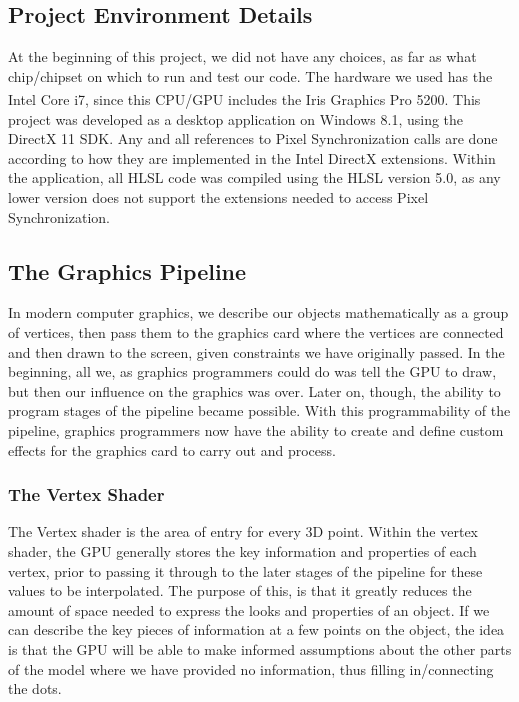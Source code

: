 \documentclass[a4paper, 12pt]{article}
\begin{document}
\subsection{Project Environment Details}
\label{hardware}

At the beginning of this project, we did not have any choices, as far as what
chip/chipset on which to run and test our code. The hardware we used has the
Intel\textsuperscript{\textregistered} Core i7, since this CPU/GPU includes
the Iris\textsuperscript{\texttrademark} Graphics Pro 5200. This project was
developed as a desktop application on Windows 8.1, using the DirectX 11 SDK.
Any and all references to Pixel Synchronization calls are done according to
how they are implemented in the Intel DirectX extensions. Within the
application, all HLSL code was compiled using the HLSL version 5.0, as any
lower version does not support the extensions needed to access Pixel
Synchronization.


\subsection{The Graphics Pipeline}

In modern computer graphics, we describe our objects mathematically as a group
of vertices, then pass them to the graphics card where the vertices are
connected and then drawn to the screen, given constraints we have originally
passed. In the beginning, all we, as graphics programmers could do was tell
the GPU to draw, but then our influence on the graphics was over. Later on,
though, the ability to program stages of the pipeline became possible. With
this programmability of the pipeline, graphics programmers now have the
ability to create and define custom effects for the graphics card to carry out
and process.

\subsubsection{The Vertex Shader}

The Vertex shader is the area of entry for every 3D point. Within the vertex
shader, the GPU generally stores the key information and properties of each
vertex, prior to passing it through to the later stages of the pipeline for
these values to be interpolated. The purpose of this, is that it greatly
reduces the amount of space needed to express the looks and properties of an
object. If we can describe the key pieces of information at a few points on
the object, the idea is that the GPU will be able to make informed assumptions
about the other parts of the model where we have provided no information, thus
filling in/connecting the dots.
\end{document}
